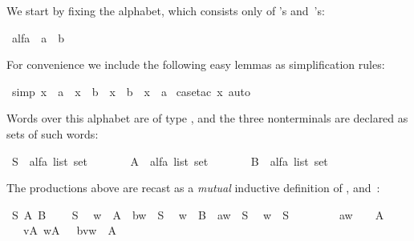 \begin{isabellebody}
\begin{isamarkuptext}
We start by fixing the alphabet, which consists only of 's
and~'s:%
\end{isamarkuptext}%
\isamarkuptrue%
\ alfa\ {\isacharequal}\ a\ {\isacharbar}\ b\isamarkupfalse%
%
\begin{isamarkuptext}%
\noindent
For convenience we include the following easy lemmas as simplification rules:%
\end{isamarkuptext}%
\isamarkuptrue%
\ {\isacharbrackleft}simp{\isacharbrackright}{\isacharcolon}\ {\isachardoublequote}{\isacharparenleft}x\ {\isasymnoteq}\ a{\isacharparenright}\ {\isacharequal}\ {\isacharparenleft}x\ {\isacharequal}\ b{\isacharparenright}\ {\isasymand}\ {\isacharparenleft}x\ {\isasymnoteq}\ b{\isacharparenright}\ {\isacharequal}\ {\isacharparenleft}x\ {\isacharequal}\ a{\isacharparenright}{\isachardoublequote}\isanewline
\isamarkupfalse%
\ {\isacharparenleft}case{\isacharunderscore}tac\ x{\isacharcomma}\ auto{\isacharparenright}\isamarkupfalse%
%
\begin{isamarkuptext}%
\noindent
Words over this alphabet are of type , and
the three nonterminals are declared as sets of such words:%
\end{isamarkuptext}%
\isamarkuptrue%
\ S\ {\isacharcolon}{\isacharcolon}\ {\isachardoublequote}alfa\ list\ set{\isachardoublequote}\isanewline
\ \ \ \ \ \ \ A\ {\isacharcolon}{\isacharcolon}\ {\isachardoublequote}alfa\ list\ set{\isachardoublequote}\isanewline
\ \ \ \ \ \ \ B\ {\isacharcolon}{\isacharcolon}\ {\isachardoublequote}alfa\ list\ set{\isachardoublequote}\isamarkupfalse%
%
\begin{isamarkuptext}%
\noindent
The productions above are recast as a \emph{mutual} inductive
definition
of ,  and~:%
\end{isamarkuptext}%
\isamarkuptrue%
\ S\ A\ B\isanewline
{}\isanewline
\ \ {\isachardoublequote}{\isacharbrackleft}{\isacharbrackright}\ {\isasymin}\ S{\isachardoublequote}\isanewline
\ \ {\isachardoublequote}w\ {\isasymin}\ A\ {\isasymLongrightarrow}\ b{\isacharhash}w\ {\isasymin}\ S{\isachardoublequote}\isanewline
\ \ {\isachardoublequote}w\ {\isasymin}\ B\ {\isasymLongrightarrow}\ a{\isacharhash}w\ {\isasymin}\ S{\isachardoublequote}\isanewline
\isanewline
\ \ {\isachardoublequote}w\ {\isasymin}\ S\ \ \ \ \ \ \ \ {\isasymLongrightarrow}\ a{\isacharhash}w\ \ \ {\isasymin}\ A{\isachardoublequote}\isanewline
\ \ {\isachardoublequote}{\isasymlbrakk}\ v{\isasymin}A{\isacharsemicolon}\ w{\isasymin}A\ {\isasymrbrakk}\ {\isasymLongrightarrow}\ b{\isacharhash}v{\isacharat}w\ {\isasymin}\ A{\isachardoublequote}\isanewline

\end{isabellebody}
